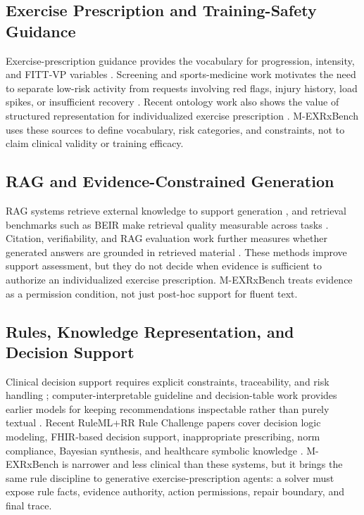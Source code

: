 \documentclass{ceurart}
\begin{document}
\subsection{Exercise Prescription and Training-Safety Guidance}

Exercise-prescription guidance provides the vocabulary for progression, intensity, and FITT-VP variables \cite{garber2011exercise,acsm2021guidelines,who2020physicalactivity}. Screening and sports-medicine work motivates the need to separate low-risk activity from requests involving red flags, injury history, load spikes, or insufficient recovery \cite{riebe2015screening,vangent2007runninginjuries,soligard2016load,gabbett2016training}. Recent ontology work also shows the value of structured representation for individualized exercise prescription \cite{liu2024exmo}. M-EXRxBench uses these sources to define vocabulary, risk categories, and constraints, not to claim clinical validity or training efficacy.

\subsection{RAG and Evidence-Constrained Generation}

RAG systems retrieve external knowledge to support generation \cite{lewis2020rag}, and retrieval benchmarks such as BEIR make retrieval quality measurable across tasks \cite{thakur2021beir}. Citation, verifiability, and RAG evaluation work further measures whether generated answers are grounded in retrieved material \cite{gao2023alce,liu2023verifiability,es2023ragas}. These methods improve support assessment, but they do not decide when evidence is sufficient to authorize an individualized exercise prescription. M-EXRxBench treats evidence as a permission condition, not just post-hoc support for fluent text.

\subsection{Rules, Knowledge Representation, and Decision Support}

Clinical decision support requires explicit constraints, traceability, and risk handling \cite{sutton2020cdss}; computer-interpretable guideline and decision-table work provides earlier models for keeping recommendations inspectable rather than purely textual \cite{samwald2012arden,boxwala2004glif3,omg2024dmn}. Recent RuleML+RR Rule Challenge papers cover decision logic modeling, FHIR-based decision support, inappropriate prescribing, norm compliance, Bayesian synthesis, and healthcare symbolic knowledge \cite{goossens2023gpt3decision,kober2023fhir,redeker2023inappropriateprescribing,mitsikas2024normcompliance,sowerby2025bayesianCDSS,sirocchi2024healthcareSymbolicML}. M-EXRxBench is narrower and less clinical than these systems, but it brings the same rule discipline to generative exercise-prescription agents: a solver must expose rule facts, evidence authority, action permissions, repair boundary, and final trace.
\end{document}
